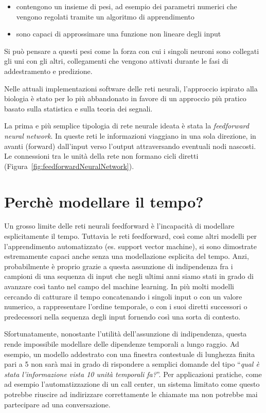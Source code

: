 \begin{itemize}
  \item contengono un insieme di pesi, ad esempio dei parametri numerici che
        vengono regolati tramite un algoritmo di apprendimento
  \item sono capaci di approssimare una funzione non lineare degli input
\end{itemize}

Si pu\`o pensare a questi pesi come la forza con cui i singoli neuroni sono
collegati gli uni con gli altri, collegamenti che vengono attivati durante le
fasi di addestramento e predizione.

Nelle attuali implementazioni software delle reti neurali, l'approccio ispirato
alla biologia \`e stato per lo pi\`u abbandonato in favore di un approccio pi\`u
pratico basato sulla statistica e sulla teoria dei segnali.

La prima e pi\`u semplice tipologia di rete neurale ideata \`e stata la
\emph{feedforward neural network}. In queste reti le informazioni viaggiano in
una sola direzione, in avanti (forward) dall'input verso l'output attraversando
eventuali nodi nascosti. Le connessioni tra le unit\`a della rete non formano
cicli diretti (Figura~\ref{fig:feedforwardNeuralNetwork}).

\section{Perch\`e modellare il tempo?}

Un grosso limite delle reti neurali feedforward \`e l'incapacit\`a di modellare
esplicitamente il tempo. Tuttavia le reti feedforward, cos\`i come altri modelli
per l'apprendimento automatizzato (es. support vector machine), si sono dimostrate
estremamente capaci anche senza una modellazione esplicita del tempo. Anzi,
probabilmente \`e proprio grazie a questa assunzione di indipendenza fra i campioni
di una sequenza di input che negli ultimi anni siamo stati in grado di avanzare
cos\`i tanto nel campo del machine learning. In pi\`u molti modelli cercando di
catturare il tempo concatenando i singoli input o con un valore numerico, a
rappresentare l'ordine temporale, o con i suoi diretti successori o predecessori
nella sequenza degli input fornendo cos\`i una sorta di contesto.

Sfortunatamente, nonostante l'utilit\`a dell'assunzione di indipendenza, questa
rende impossibile modellare delle dipendenze temporali a lungo raggio. Ad esempio,
un modello addestrato con una finestra contestuale di lunghezza finita pari a 5
non sar\`a mai in grado di rispondere a semplici domande del tipo ``\emph{qual
\`e stata l'informazione vista 10 unit\`a temporali fa?}''. Per applicazioni
pratiche, come ad esempio l'automatizzazione di un call center, un sistema
limitato come questo potrebbe riuscire ad indirizzare correttamente le chiamate
ma non potrebbe mai partecipare ad una conversazione.

